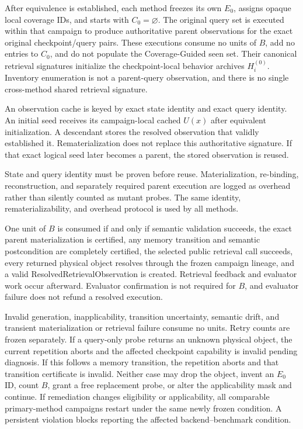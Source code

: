 After equivalence is established, each method freezes its own \(E_0\), assigns
opaque local coverage IDs, and starts with \(C_0=\varnothing\). The original
query set is executed within that campaign to produce authoritative parent
observations for the exact original checkpoint/query pairs. These executions
consume no units of \(B\), add no entries to \(C_0\), and do not populate the
Coverage-Guided seen set. Their canonical retrieval signatures initialize the
checkpoint-local behavior archives \(H_i^{(0)}\). Inventory enumeration is not
a parent-query observation, and there is no single cross-method shared
retrieval signature.

An observation cache is keyed by exact state identity and exact query
identity. An initial seed receives its campaign-local cached \(U(x)\) after
equivalent initialization. A descendant stores the resolved observation that
validly established it. Rematerialization does not replace this authoritative
signature. If that exact logical seed later becomes a parent, the stored
observation is reused.

State and query identity must be proven before reuse. Materialization,
re-binding, reconstruction, and separately required parent execution are
logged as overhead rather than silently counted as mutant probes. The same
identity, rematerializability, and overhead protocol is used by all methods.

One unit of \(B\) is consumed if and only if semantic validation succeeds, the
exact parent materialization is certified, any memory transition and semantic
postcondition are completely certified, the selected public retrieval call
succeeds, every returned physical object resolves through the frozen campaign
lineage, and a valid ResolvedRetrievalObservation is created. Retrieval
feedback and evaluator work occur afterward. Evaluator confirmation is not
required for \(B\), and evaluator failure does not refund a resolved
execution.

Invalid generation, inapplicability, transition uncertainty, semantic drift,
and transient materialization or retrieval failure consume no units. Retry
counts are frozen separately. If a query-only probe returns an unknown physical
object, the current repetition aborts and the affected checkpoint capability
is invalid pending diagnosis. If this follows a memory transition, the
repetition aborts and that transition certificate is invalid. Neither case may
drop the object, invent an \(E_0\) ID, count \(B\), grant a free replacement
probe, or alter the applicability mask and continue. If remediation changes
eligibility or applicability, all comparable primary-method campaigns restart
under the same newly frozen condition. A persistent violation blocks reporting
the affected backend--benchmark condition.

